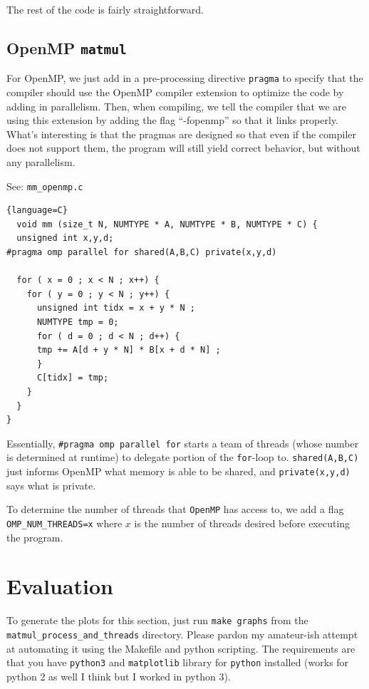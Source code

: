 \documentclass{article}
\begin{document}
The rest of the code is fairly straightforward.
\subsection{OpenMP \texttt{matmul}}
For OpenMP, we just add in a pre-processing directive \texttt{pragma} to specify that the compiler should use the OpenMP compiler extension to optimize the code by adding in parallelism. Then, when compiling, we tell the compiler that we are using this extension by adding the flag ``-fopenmp'' so that it links properly.  What's interesting is that the pragmas are designed so that even if the compiler does not support them, the program will still yield correct behavior, but without any parallelism.

See: \texttt{mm\_openmp.c}
\begin{lstlisting}{language=C}
  void mm (size_t N, NUMTYPE * A, NUMTYPE * B, NUMTYPE * C) {
  unsigned int x,y,d;
#pragma omp parallel for shared(A,B,C) private(x,y,d)

  for ( x = 0 ; x < N ; x++) {
    for ( y = 0 ; y < N ; y++) {
      unsigned int tidx = x + y * N ;
      NUMTYPE tmp = 0;
      for ( d = 0 ; d < N ; d++) {
	  tmp += A[d + y * N] * B[x + d * N] ;
      }
      C[tidx] = tmp;
    }
  }
}
\end{lstlisting}

Essentially, \texttt{\#pragma omp parallel for} starts a team of threads (whose number is determined at runtime) to delegate portion of the \texttt{for}-loop to. \texttt{shared(A,B,C)} just informs OpenMP what memory is able to be shared, and \texttt{private(x,y,d)} says what is private.

To determine the number of threads that \texttt{OpenMP} has access to, we add a flag \texttt{OMP\_NUM\_THREADS=x} where $x$ is the number of threads desired before executing the program.

\section{Evaluation}
To generate the plots for this section, just run \texttt{make graphs} from the \texttt{matmul\_process\_and\_threads} directory. Please pardon my amateur-ish attempt at automating it using the Makefile and python scripting. The requirements are that you have \texttt{python3} and \texttt{matplotlib} library for \texttt{python} installed (works for python 2 as well I think but I worked in python 3).
\end{document}
